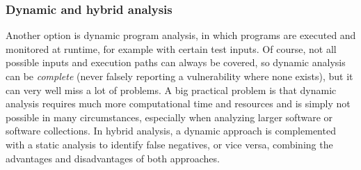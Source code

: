 \documentclass[
a4paper,
pagesize,
pdftex,
12pt,
twoside, %
BCOR=5mm, %
ngerman,
fleqn,
final,
]{scrartcl}
\begin{document}
	\subsubsection{Dynamic and hybrid analysis}
	Another option is dynamic program analysis, in which programs are executed and monitored at runtime, for example with certain test inputs. Of course, not all possible inputs and execution paths can always be covered, so dynamic analysis can be \textit{complete} (never falsely reporting a vulnerability where none exists), but it can very well miss a lot of problems. A big practical problem is that dynamic analysis requires much more computational time and resources and is simply not possible in many circumstances, especially when analyzing larger software or software collections.
	In hybrid analysis, a dynamic approach is complemented with a static analysis to identify false negatives, or vice versa, combining the advantages and disadvantages of both approaches. 
	
\end{document}
